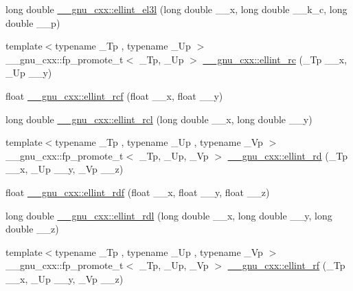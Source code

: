 \begin{DoxyCompactItemize}
\item 
long double \hyperlink{group__gnu__math__spec__func_ga0d90e66f799a2ebe4bec43eef0d53355}{\+\_\+\+\_\+gnu\+\_\+cxx\+::ellint\+\_\+el3l} (long double \+\_\+\+\_\+x, long double \+\_\+\+\_\+k\+\_\+c, long double \+\_\+\+\_\+p)
\item 
{\footnotesize template$<$typename \+\_\+\+Tp , typename \+\_\+\+Up $>$ }\\\+\_\+\+\_\+gnu\+\_\+cxx\+::fp\+\_\+promote\+\_\+t$<$ \+\_\+\+Tp, \+\_\+\+Up $>$ \hyperlink{group__gnu__math__spec__func_ga7d3d42f5f71a74266be8aaca528056bf}{\+\_\+\+\_\+gnu\+\_\+cxx\+::ellint\+\_\+rc} (\+\_\+\+Tp \+\_\+\+\_\+x, \+\_\+\+Up \+\_\+\+\_\+y)
\item 
float \hyperlink{group__gnu__math__spec__func_gaad5316092224ec3d92b66e79ef266adf}{\+\_\+\+\_\+gnu\+\_\+cxx\+::ellint\+\_\+rcf} (float \+\_\+\+\_\+x, float \+\_\+\+\_\+y)
\item 
long double \hyperlink{group__gnu__math__spec__func_ga9b2f1cdeacd3615c702a77d995a0129c}{\+\_\+\+\_\+gnu\+\_\+cxx\+::ellint\+\_\+rcl} (long double \+\_\+\+\_\+x, long double \+\_\+\+\_\+y)
\item 
{\footnotesize template$<$typename \+\_\+\+Tp , typename \+\_\+\+Up , typename \+\_\+\+Vp $>$ }\\\+\_\+\+\_\+gnu\+\_\+cxx\+::fp\+\_\+promote\+\_\+t$<$ \+\_\+\+Tp, \+\_\+\+Up, \+\_\+\+Vp $>$ \hyperlink{group__gnu__math__spec__func_gad29dae6abc783c8fe952dba477e65309}{\+\_\+\+\_\+gnu\+\_\+cxx\+::ellint\+\_\+rd} (\+\_\+\+Tp \+\_\+\+\_\+x, \+\_\+\+Up \+\_\+\+\_\+y, \+\_\+\+Vp \+\_\+\+\_\+z)
\item 
float \hyperlink{group__gnu__math__spec__func_ga52e7cc797b9d199b7468cdbec6505357}{\+\_\+\+\_\+gnu\+\_\+cxx\+::ellint\+\_\+rdf} (float \+\_\+\+\_\+x, float \+\_\+\+\_\+y, float \+\_\+\+\_\+z)
\item 
long double \hyperlink{group__gnu__math__spec__func_ga68a38a5f320a7184cec4b120ddef6a65}{\+\_\+\+\_\+gnu\+\_\+cxx\+::ellint\+\_\+rdl} (long double \+\_\+\+\_\+x, long double \+\_\+\+\_\+y, long double \+\_\+\+\_\+z)
\item 
{\footnotesize template$<$typename \+\_\+\+Tp , typename \+\_\+\+Up , typename \+\_\+\+Vp $>$ }\\\+\_\+\+\_\+gnu\+\_\+cxx\+::fp\+\_\+promote\+\_\+t$<$ \+\_\+\+Tp, \+\_\+\+Up, \+\_\+\+Vp $>$ \hyperlink{group__gnu__math__spec__func_gae4859494464c7eaf98193f92b2235bc1}{\+\_\+\+\_\+gnu\+\_\+cxx\+::ellint\+\_\+rf} (\+\_\+\+Tp \+\_\+\+\_\+x, \+\_\+\+Up \+\_\+\+\_\+y, \+\_\+\+Vp \+\_\+\+\_\+z)
\item 

\end{DoxyCompactItemize}
